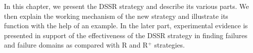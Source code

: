 In this chapter, we present the DSSR strategy and describe its various parts. We then explain the working mechanism of the new strategy and illustrate its function with the help of an example. In the later part,  experimental evidence is presented in support of the effectiveness of the DSSR strategy in finding failures and failure domains as compared with R and R$^+$ strategies.










